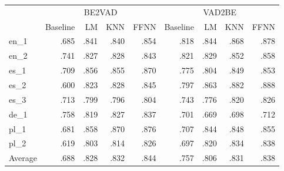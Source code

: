 \begin{tabular}{|l|rrrr|rrrr|}
\hline
{} & \multicolumn{4}{c|}{BE2VAD} & \multicolumn{4}{c|}{VAD2BE} \\
{} & Baseline & LM & KNN & FFNN & Baseline & LM & KNN & FFNN \\
\hline\hline
en\_1    &            .685 &                .841 &                 .840 &            .854 &            .818 &                .844 &                 .868 &            .878 \\
en\_2    &            .741 &                .827 &                 .828 &            .843 &            .821 &                .829 &                 .852 &            .858 \\
es\_1    &            .709 &                .856 &                 .855 &            .870 &            .775 &                .804 &                 .849 &            .853 \\
es\_2    &            .600 &                .823 &                 .828 &            .845 &            .797 &                .863 &                 .882 &            .888 \\
es\_3    &            .713 &                .799 &                 .796 &            .804 &            .743 &                .776 &                 .820 &            .826 \\
de\_1    &            .758 &                .819 &                 .827 &            .837 &            .701 &                .669 &                 .698 &            .712 \\
pl\_1    &            .681 &                .858 &                 .870 &            .876 &            .707 &                .844 &                 .848 &            .855 \\
pl\_2    &            .619 &                .803 &                 .814 &            .826 &            .697 &                .820 &                 .834 &            .838 \\
\hline
Average &            .688 &                .828 &                 .832 &            .844 &            .757 &                .806 &                 .831 &            .838 \\
\hline
\end{tabular}
